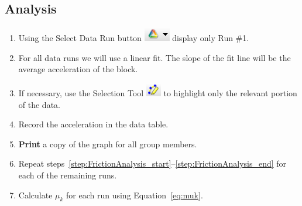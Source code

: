 \documentclass[main.tex]{subfiles}
\begin{document}
\subsection*{Analysis}
\begin{enumerate}
\item \label{step:FrictionAnalysis_start}
Using the Select Data Run button \includegraphics{Select_Data_Run} display only Run \#1.
\item
For all data runs we will use a linear fit. The slope of the fit line will be the average acceleration of the block.
\item
If necessary, use the Selection Tool \includegraphics{Selection_Tool} to highlight only the relevant portion of the data. 
\item \label{step:FrictionAnalysis_end}
Record the acceleration in the data table.
\item
\textbf{Print} a copy of the graph for all group members.
\item
Repeat steps~\ref{step:FrictionAnalysis_start}--\ref{step:FrictionAnalysis_end} for each of the remaining runs.
\item
Calculate $\mu_k$ for each run using Equation~\eqref{eq:muk}.
\end{enumerate}
\end{document}
